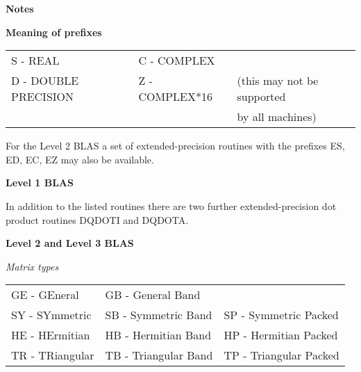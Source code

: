 \vspace*{\fill}
\pagebreak 

{\setlength{\textwidth}{4.0in}}

\vspace{.5in}
{\bf Notes}

\vspace{.25in}

{\bf Meaning of prefixes}

\vspace{.25in}

\begin{tabular}{l l l}
S - REAL              &  C - COMPLEX \\
D - DOUBLE PRECISION  &  Z - COMPLEX*16    & (this may not be supported \\
                      &                    & by all machines) \\
\end{tabular}

\vspace{.25in}
\noindent

For the Level 2 BLAS a set of extended-precision routines with the prefixes
ES, ED, EC, EZ may also be available.

\vspace{.25in}

{\bf Level 1 BLAS }

\vspace{.25in}
\noindent

In addition to the listed routines there are two further 
extended-precision dot product routines DQDOTI and \mbox{DQDOTA}.

\vspace{.25in}

{\bf Level 2 and Level 3 BLAS }

\vspace{.25in}

{\it Matrix types}

\vspace{.25in}

\begin {tabular}{l l l}
GE - GEneral     &  GB - General Band \\
SY - SYmmetric   &  SB - Symmetric Band    &  SP - Symmetric Packed \\
HE - HErmitian   &  HB - Hermitian Band    &  HP - Hermitian Packed \\
TR - TRiangular  &  TB - Triangular Band   &  TP - Triangular Packed \\
\end {tabular}


